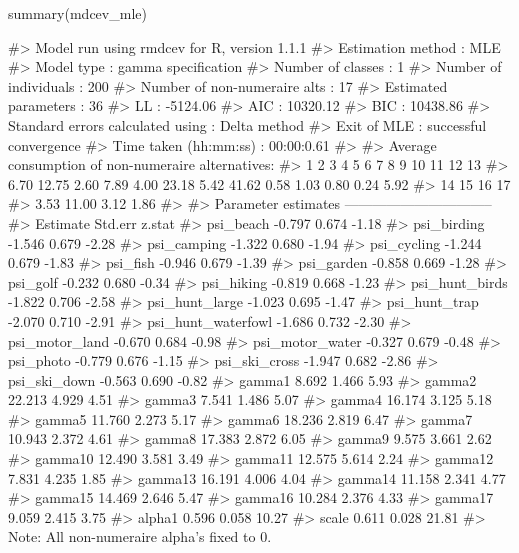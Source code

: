 \begin{Schunk}
\begin{Sinput}
summary(mdcev_mle)
\end{Sinput}
\begin{Soutput}
#> Model run using rmdcev for R, version 1.1.1 
#> Estimation method                : MLE
#> Model type                       : gamma specification
#> Number of classes                : 1
#> Number of individuals            : 200
#> Number of non-numeraire alts     : 17
#> Estimated parameters             : 36
#> LL                               : -5124.06
#> AIC                              : 10320.12
#> BIC                              : 10438.86
#> Standard errors calculated using : Delta method
#> Exit of MLE                      : successful convergence
#> Time taken (hh:mm:ss)            : 00:00:0.61
#> 
#> Average consumption of non-numeraire alternatives:
#>     1     2     3     4     5     6     7     8     9    10    11    12    13 
#>  6.70 12.75  2.60  7.89  4.00 23.18  5.42 41.62  0.58  1.03  0.80  0.24  5.92 
#>    14    15    16    17 
#>  3.53 11.00  3.12  1.86 
#> 
#> Parameter estimates --------------------------------  
#>                    Estimate Std.err z.stat
#> psi_beach            -0.797   0.674  -1.18
#> psi_birding          -1.546   0.679  -2.28
#> psi_camping          -1.322   0.680  -1.94
#> psi_cycling          -1.244   0.679  -1.83
#> psi_fish             -0.946   0.679  -1.39
#> psi_garden           -0.858   0.669  -1.28
#> psi_golf             -0.232   0.680  -0.34
#> psi_hiking           -0.819   0.668  -1.23
#> psi_hunt_birds       -1.822   0.706  -2.58
#> psi_hunt_large       -1.023   0.695  -1.47
#> psi_hunt_trap        -2.070   0.710  -2.91
#> psi_hunt_waterfowl   -1.686   0.732  -2.30
#> psi_motor_land       -0.670   0.684  -0.98
#> psi_motor_water      -0.327   0.679  -0.48
#> psi_photo            -0.779   0.676  -1.15
#> psi_ski_cross        -1.947   0.682  -2.86
#> psi_ski_down         -0.563   0.690  -0.82
#> gamma1                8.692   1.466   5.93
#> gamma2               22.213   4.929   4.51
#> gamma3                7.541   1.486   5.07
#> gamma4               16.174   3.125   5.18
#> gamma5               11.760   2.273   5.17
#> gamma6               18.236   2.819   6.47
#> gamma7               10.943   2.372   4.61
#> gamma8               17.383   2.872   6.05
#> gamma9                9.575   3.661   2.62
#> gamma10              12.490   3.581   3.49
#> gamma11              12.575   5.614   2.24
#> gamma12               7.831   4.235   1.85
#> gamma13              16.191   4.006   4.04
#> gamma14              11.158   2.341   4.77
#> gamma15              14.469   2.646   5.47
#> gamma16              10.284   2.376   4.33
#> gamma17               9.059   2.415   3.75
#> alpha1                0.596   0.058  10.27
#> scale                 0.611   0.028  21.81
#> Note: All non-numeraire alpha's fixed to 0.
\end{Soutput}
\end{Schunk}


